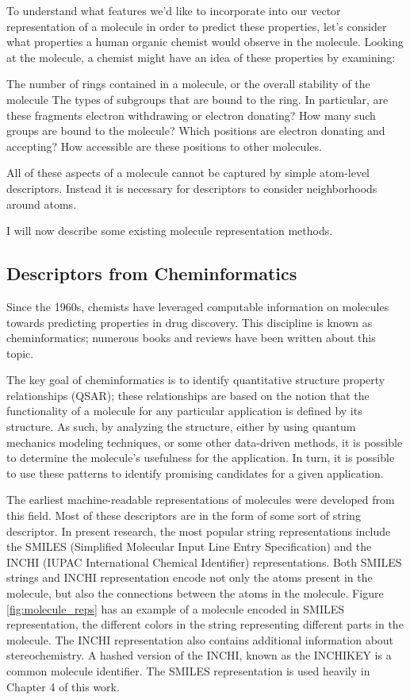 To understand what features we'd like to incorporate into our vector representation of a molecule in order to predict these properties, let's consider what properties a human organic chemist would observe in the molecule. Looking at the molecule, a chemist might have an idea of these properties by examining:

The number of rings contained in a molecule, or the overall stability of the molecule
The types of subgroups that are bound to the ring. In particular, are these fragments electron withdrawing or electron donating?
How many such groups are bound to the molecule?
Which positions are electron donating and accepting? How accessible are these positions to other molecules.

All of these aspects of a molecule cannot be captured by simple atom-level descriptors. Instead it is necessary for descriptors to consider neighborhoods around atoms.

I will now describe some existing molecule representation methods.

\subsection{Descriptors from Cheminformatics}

Since the 1960s, chemists have leveraged computable information on molecules towards predicting properties in drug discovery. This discipline is known as cheminformatics; numerous books and reviews have been written about this topic\cite{gasteiger2014solved,chonde2014cheminformatics,warr2005twenty,gasteiger2015cheminformatics}.

The key goal of cheminformatics is to identify quantitative structure property relationships (QSAR); these relationships are based on the notion that the functionality of a molecule for any particular application is defined by its structure. As such, by analyzing the structure, either by using quantum mechanics modeling techniques, or some other data-driven methods, it is possible to determine the molecule's usefulness for the application. In turn, it is possible to use these patterns to identify promising candidates for a given application.

The earliest machine-readable representations of molecules were developed from this field. Most of these descriptors are in the form of some sort of string descriptor. In present research, the most popular string representations include the SMILES (Simplified Molecular Input Line Entry Specification) and the INCHI (IUPAC International Chemical Identifier) representations\cite{weininger1988smiles}.  Both SMILES strings and INCHI representation encode not only the atoms present in the molecule, but also the connections between the atoms in the molecule. Figure \ref{fig:molecule_reps} has an example of a molecule encoded in SMILES representation, the different colors in the string representing different parts in the molecule. The INCHI representation also contains additional information about stereochemistry. A hashed version of the INCHI, known as the INCHIKEY is a common molecule identifier. The SMILES representation is used heavily in Chapter 4 of this work.

